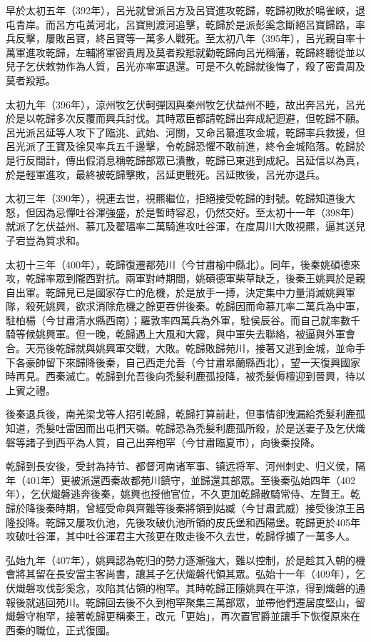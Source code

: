 早於太初五年（392年），呂光就曾派呂方及呂寶進攻乾歸，乾歸初敗於鳴雀峽，退屯青岸。而呂方屯黃河北，呂寶則渡河追擊，乾歸於是派彭奚念斷絕呂寶歸路，率兵反擊，屢敗呂寶，終呂寶等一萬多人戰死。至太初八年（395年），呂光親自率十萬軍進攻乾歸，左輔將軍密貴周及莫者羖羝就勸乾歸向呂光稱藩，乾歸終聽從並以兒子乞伏敕勃作為人質，呂光亦率軍退還。可是不久乾歸就後悔了，殺了密貴周及莫者羖羝。

太初九年（396年），涼州牧乞伏軻彈因與秦州牧乞伏益州不睦，故出奔呂光，呂光於是以乾歸多次反覆而興兵討伐。其時眾臣都請乾歸出奔成紀迴避，但乾歸不願。呂光派呂延等人攻下了臨洮、武始、河關，又命呂纂進攻金城，乾歸率兵救援，但呂光派了王寶及徐炅率兵五千邊擊，令乾歸恐懼不敢前進，終令金城陷落。乾歸於是行反間計，傳出假消息稱乾歸部眾已潰散，乾歸已東逃到成紀。呂延信以為真，於是輕軍進攻，最終被乾歸擊敗，呂延更戰死。呂延敗後，呂光亦退兵。

太初三年（390年），視連去世，視羆繼位，拒絕接受乾歸的封號。乾歸知道後大怒，但因為忌憚吐谷渾強盛，於是暫時容忍，仍然交好。至太初十一年（398年）就派了乞伏益州、慕兀及翟瑥率二萬騎進攻吐谷渾，在度周川大敗視羆，逼其送兒子宕豈為質求和。

太初十三年（400年），乾歸復遷都苑川（今甘肅榆中縣北）。同年，後秦姚碩德來攻，乾歸率眾到隴西對抗。兩軍對峙期間，姚碩德軍柴草缺乏，後秦王姚興於是親自出軍。乾歸見已是國家存亡的危機，於是放手一搏，決定集中力量消滅姚興軍隊，殺死姚興，欲求消除危機之餘更吞併後秦。乾歸因而命慕兀率二萬兵為中軍，駐柏楊（今甘肅清水縣西南）；羅敦率四萬兵為外軍，駐侯辰谷。而自己就率數千騎等候姚興軍。但一晚，乾歸遇上大風和大霧，與中軍失去聯絡，被逼與外軍會合。天亮後乾歸就與姚興軍交戰，大敗。乾歸敗歸苑川，接著又逃到金城，並命手下各豪帥留下來歸降後秦，自己西走允吾（今甘肅皋蘭縣西北），望一天復興國家時再見。西秦滅亡。乾歸到允吾後向禿髮利鹿孤投降，被禿髮傉檀迎到晉興，待以上賓之禮。

後秦退兵後，南羌梁戈等人招引乾歸，乾歸打算前赴，但事情卻洩漏給禿髮利鹿孤知道，禿髮吐雷因而出屯捫天嶺。乾歸恐為禿髮利鹿孤所殺，於是送妻子及乞伏熾磐等諸子到西平為人質，自己出奔枹罕（今甘肅臨夏市），向後秦投降。

乾歸到長安後，受封為持节、都督河南诸军事、镇远将军、河州刺史、归义侯，隔年（401年）更被派還西秦故都苑川鎮守，並歸還其部眾。至後秦弘始四年（402年），乞伏熾磐逃奔後秦，姚興也授他官位，不久更加乾歸散騎常侍、左賢王。乾歸於降後秦時期，曾經受命與齊難等後秦將領到姑臧（今甘肅武威）接受後涼王呂隆投降。乾歸又屢攻仇池，先後攻破仇池所領的皮氏堡和西陽堡。乾歸更於405年攻破吐谷渾，其中吐谷渾君主大孩更在敗走後不久去世，乾歸俘擄了一萬多人。

弘始九年（407年），姚興認為乾归的勢力逐漸強大，難以控制，於是趁其入朝的機會將其留在長安當主客尚書，讓其子乞伏熾磐代領其眾。弘始十一年（409年），乞伏熾磐攻伐彭奚念，攻陷其佔領的枹罕。其時乾歸正隨姚興在平涼，得到熾磐的通報後就逃回苑川。乾歸回去後不久到枹罕聚集三萬部眾，並帶他們遷居度堅山，留熾磐守枹罕，接著乾歸更稱秦王，改元「更始」，再次置官爵並讓手下恢復原來在西秦的職位，正式復國。

